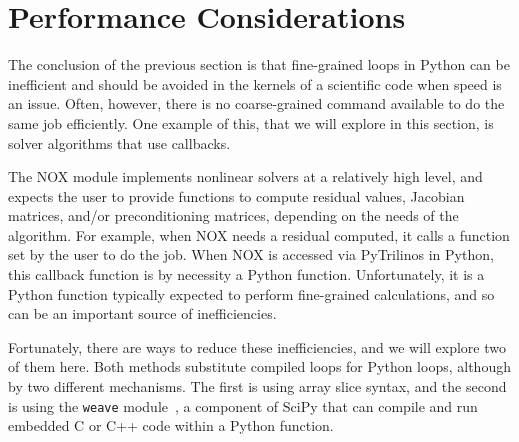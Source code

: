 \documentclass[acmtocl]{acmtrans2m}
\begin{document}
%
\section{Performance Considerations}
\label{sec:performance}

The conclusion of the previous section is that fine-grained loops in
Python can be inefficient and should be avoided in the kernels of a
scientific code when speed is an issue.  Often, however, there is no
coarse-grained command available to do the same job efficiently.  One
example of this, that we will explore in this section, is solver
algorithms that use callbacks.

The NOX module implements nonlinear solvers at a relatively high
level, and expects the user to provide functions to compute residual
values, Jacobian matrices, and/or preconditioning matrices, depending
on the needs of the algorithm.  For example, when NOX needs a residual
computed, it calls a function set by the user to do the job.  When NOX
is accessed via PyTrilinos in Python, this callback function is by
necessity a Python function.  Unfortunately, it is a Python function
typically expected to perform fine-grained calculations, and so can be
an important source of inefficiencies.

Fortunately, there are ways to reduce these inefficiencies, and we
will explore two of them here.  Both methods substitute compiled loops
for Python loops, although by two different mechanisms.  The first is
using array slice syntax, and the second is using the {\tt weave}
module~\cite{Weave-Users-Guide}, a component of SciPy that can compile
and run embedded C or C++ code within a Python function.
\end{document}
